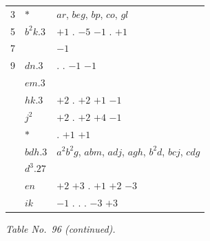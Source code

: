 \documentclass[11pt]{article}
\begin{document}
\begin{center}
\begin{tabular}{lll}
3 & $*$ & $ar$, $beg$, $bp$, $co$, $gl$ \\
5 & $b^{2}k.3$ & $+1$ \quad . \quad $-5$ $-1$ \quad . \quad $+1$ \\
7 & & \quad $-1$ \\
9 & $dn.3$ & \quad . \quad . \quad $-1$ $-1$ \\
& $em.3$ & \\
& $hk.3$ & $+2$ \quad . \quad $+2$ $+1$ $-1$ \\
& $j^{2}$ & $+2$ \quad . \quad $+2$ $+4$ $-1$ \\
& $*$ & . \quad $+1$ $+1$ \\
& $bdh.3$ & $a^{2}b^{2}g$, $abm$, $adj$, $agh$, $b^{2}d$, $bcj$, $cdg$ \\
& $d^{3}.27$ & \\
& $en$ & \quad $+2$ $+3$ . \quad $+1$ $+2$ $-3$ \\
& $ik$ & \quad $-1$ \quad . \quad . \quad . \quad $-3$ $+3$ \\
\end{tabular}
\end{center}


\begin{center}
\textit{Table No.\ 96 (continued).}
\end{center}
\end{document}
